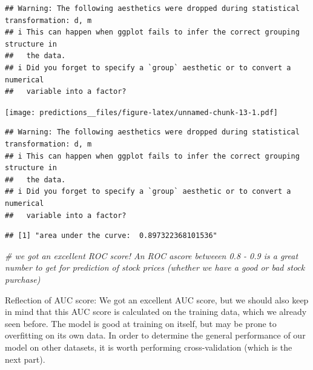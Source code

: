 \documentclass[
]{article}
\newenvironment{Shaded}{\begin{snugshade}}{\end{snugshade}}
\newcommand{\CommentTok}[1]{\textcolor[rgb]{0.56,0.35,0.01}{\textit{#1}}}
\newcommand{\FunctionTok}[1]{\textcolor[rgb]{0.00,0.00,0.00}{#1}}
\newcommand{\NormalTok}[1]{#1}
\newcommand{\SpecialCharTok}[1]{\textcolor[rgb]{0.00,0.00,0.00}{#1}}
\newcommand{\StringTok}[1]{\textcolor[rgb]{0.31,0.60,0.02}{#1}}
\begin{document}
\begin{verbatim}
## Warning: The following aesthetics were dropped during statistical transformation: d, m
## i This can happen when ggplot fails to infer the correct grouping structure in
##   the data.
## i Did you forget to specify a `group` aesthetic or to convert a numerical
##   variable into a factor?
\end{verbatim}

\texttt{[image: predictions\_\_files/figure-latex/unnamed-chunk-13-1.pdf]}

\begin{Shaded}
\end{Shaded}

\begin{verbatim}
## Warning: The following aesthetics were dropped during statistical transformation: d, m
## i This can happen when ggplot fails to infer the correct grouping structure in
##   the data.
## i Did you forget to specify a `group` aesthetic or to convert a numerical
##   variable into a factor?
\end{verbatim}

\begin{verbatim}
## [1] "area under the curve:  0.897322368101536"
\end{verbatim}

\begin{Shaded}
\begin{Highlighting}[]
\CommentTok{\# we got an excellent ROC score! An ROC ascore betweeen 0.8 {-} 0.9 is a great number to get for prediction of stock prices (whether we have a good or bad stock purchase)}
\end{Highlighting}
\end{Shaded}

Reflection of AUC score: We got an excellent AUC score, but we should
also keep in mind that this AUC score is calculated on the training
data, which we already seen before. The model is good at training on
itself, but may be prone to overfitting on its own data. In order to
determine the general performance of our model on other datasets, it is
worth performing cross-validation (which is the next part).
\end{document}
